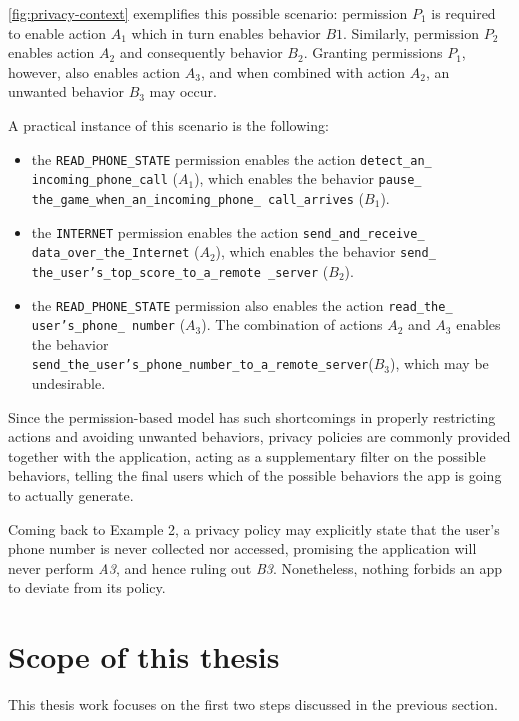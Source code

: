 \autoref{fig:privacy-context} exemplifies this possible scenario: permission $P_1$ is required to enable action $A_1$ which in turn enables behavior $B1$. Similarly, permission $P_2$ enables action $A_2$ and consequently behavior $B_2$. Granting permissions $P_1$, however, also enables action $A_3$, and when combined with action $A_2$, an unwanted behavior $B_3$ may occur.

A practical instance of this scenario is the following:
\begin{example}
\leavevmode
\label{ex:unwanted-behavior}
\begin{itemize}
  \item the \texttt{READ\_PHONE\_STATE} permission enables the action \texttt{detect\_an\_ incoming\_phone\_call} ($A_1$), which enables the behavior \texttt{pause\_ the\_game\_when\_an\_incoming\_phone\_ call\_arrives} ($B_1$).
  \item the \texttt{INTERNET} permission enables the action \texttt{\justify send\_and\_receive\_ data\_over\_the\_Internet} ($A_2$), which enables the behavior \texttt{send\_ the\_user's\_top\_score\_to\_a\_remote \_server} ($B_2$).
  \item the \texttt{READ\_PHONE\_STATE} permission also enables the action \texttt{read\_the\_ user's\_phone\_ number} ($A_3$). The combination of actions $A_2$ and $A_3$ enables the behavior \\ \texttt{send\_the\_user's\_phone\_number\_to\_a\_remote\_server}($B_3$), which may be undesirable.
\end{itemize} 
\end{example}

Since the permission-based model has such shortcomings in properly restricting actions and avoiding unwanted behaviors, privacy policies are commonly provided together with the application, acting as a supplementary filter on the possible behaviors, telling the final users which of the possible behaviors the app is going to actually generate.

Coming back to Example 2, a privacy policy may explicitly state that the user's phone number is never collected nor accessed, promising the application will never perform \emph{A3}, and hence ruling out \emph{B3}. Nonetheless, nothing forbids an app to deviate from its policy.

\section{Scope of this thesis}
This thesis work focuses on the first two steps discussed in the previous section.

